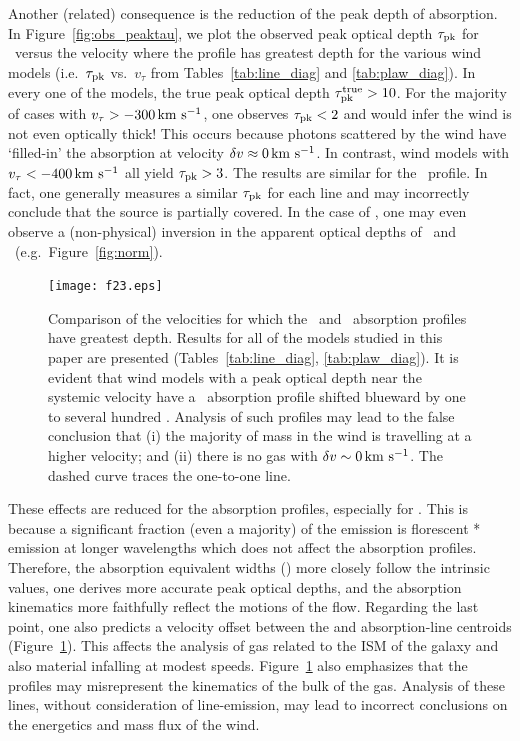 \documentclass[]{emulateapj}
\begin{document}
Another (related) consequence is the reduction of the peak depth of 
absorption.
In Figure~\ref{fig:obs_peaktau}, we plot the observed peak optical depth
$\tau_{\rm pk}$ for \mgiia\ 
versus the velocity where the profile has greatest depth 
for the various wind models (i.e.\
$\tau_{\rm pk}$ vs.\ $v_\tau$ from Tables~\ref{tab:line_diag} and
\ref{tab:plaw_diag}).   In every one of the models, the true peak
optical depth $\tau_{\rm pk}^{\rm true} > 10$.  For the
majority of cases with $v_\tau > -300\, {\rm km~s^{-1}}$, one observes $\tau_{\rm pk} <
2$ and would infer the wind is not even optically thick!
This occurs because photons scattered by the wind have `filled-in' the
absorption at velocity $\delta v \approx 0 \, {\rm km~s^{-1}}$.  In contrast, wind
models with $v_\tau < -400 \, {\rm km~s^{-1}}$ all yield $\tau_{\rm pk} > 3$.  The
results are similar for the \mgiib\ profile.  In fact, one generally
measures a similar $\tau_{\rm pk}$ for each \ion{Mg}{2} line and %
may incorrectly conclude that the source is partially covered. 
In the case of \ion{Fe}{2}, one may even observe a (non-physical)
inversion in the apparent optical depths of \feiia\ and \feiib\ (e.g.\
Figure~\ref{fig:norm}). 

\begin{figure}
\texttt{[image: f23.eps]}
\caption{
Comparison of the velocities for which the \feiia\ and \mgiia\ absorption
profiles have greatest depth.  Results for all of the models
studied in this paper are presented (Tables~\ref{tab:line_diag},
\ref{tab:plaw_diag}).  
It is evident that wind models with a peak optical depth near the
systemic velocity have a \mgiia\ absorption profile shifted blueward
by one to several hundred \kms.  Analysis of such profiles may lead to
the false conclusion 
that (i) the majority of mass in the wind is travelling at a higher
velocity; and (ii) there is no gas with $\delta v \sim 0 \, {\rm km~s^{-1}}$.
The dashed curve traces the one-to-one line.
}
\label{fig:obs_vtau}
\end{figure}

These effects %
are reduced
for the  absorption profiles, especially for \feiia.  This
is because a significant fraction (even a majority) of the
 emission is florescent \ion{Fe}{2}* emission at longer
wavelengths which does not affect the absorption profiles. 
Therefore, the \ion{Fe}{2} absorption equivalent widths (\ewabs) more
closely follow the intrinsic values, one derives more accurate peak
optical depths, and the absorption kinematics more faithfully reflect
the motions of the flow.  Regarding the last point, one also
predicts a velocity offset between the \ion{Fe}{2} and \ion{Mg}{2}
absorption-line centroids (Figure~\ref{fig:obs_vtau}).
This affects the analysis of gas related to the ISM of the galaxy and
also material infalling at modest speeds.  
Figure~\ref{fig:obs_vtau} also emphasizes that
the \ion{Mg}{2} profiles may misrepresent the kinematics of the bulk of
the gas.  Analysis of these lines, without consideration of
line-emission, may lead to incorrect conclusions on the energetics
and mass flux of the wind.
\end{document}
